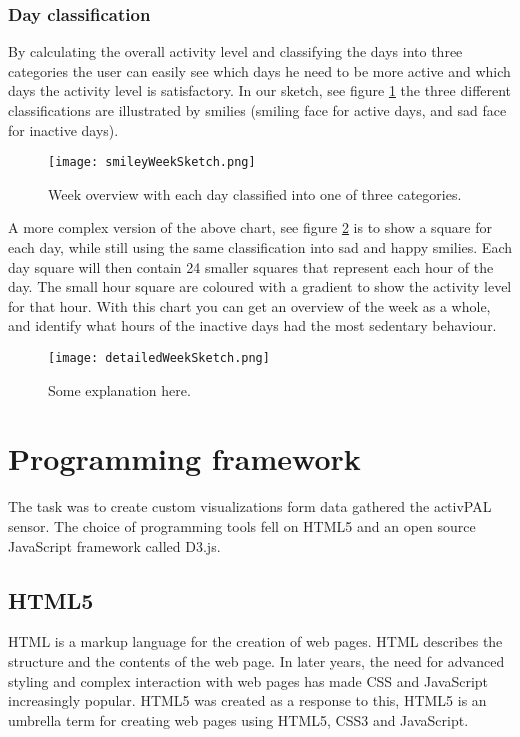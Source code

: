 \subsubsection{Day classification}
By calculating the overall activity level and classifying the days into three categories the user can easily see which days he need to be more active and which days the activity level is satisfactory. In our sketch, see figure \ref{fig:smileyWeek} the three different classifications are illustrated by smilies (smiling face for active days, and sad face for inactive days).

\begin{figure}[h!]
	\centering
		\texttt{[image: smileyWeekSketch.png]}
		\caption{\footnotesize Week overview with each day classified into one of three categories.}
		\label{fig:smileyWeek}
\end{figure}

A more complex version of the above chart, see figure \ref{fig:detailedWeek} is to show a square for each day, while still using the same classification into sad and happy smilies. Each day square will then contain 24 smaller squares that represent each hour of the day. The small hour square are coloured with a gradient to show the activity level for that hour. With this chart you can get an overview of the week as a whole, and identify what hours of the inactive days had the most sedentary behaviour. 

\begin{figure}[h!]
	\centering
		\texttt{[image: detailedWeekSketch.png]}
		\caption{\footnotesize Some explanation here.}
		\label{fig:detailedWeek}
\end{figure}

\section{Programming framework}
The task was to create custom visualizations form data gathered the activPAL sensor. The choice of programming tools fell on HTML5 and an open source JavaScript framework called D3.js.

\subsection{HTML5}
HTML is a markup language for the creation of web pages. HTML describes the structure and the contents of the web page. In later years, the need for advanced styling and complex interaction with web pages has made CSS and JavaScript increasingly popular. HTML5 was created as a response to this, HTML5 is an umbrella term for creating web pages using HTML5, CSS3 and JavaScript.

